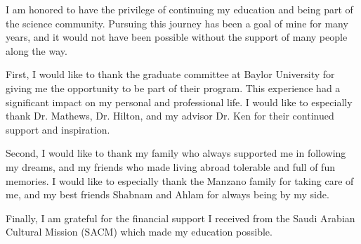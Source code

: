 
I am honored to have the privilege of continuing my education and being part of the science community. Pursuing this journey has been a goal of mine for many years, and it would not have been possible without the support of many people along the way.

First, I would like to thank the graduate committee at Baylor University for giving me the opportunity to be part of their program. This experience had a significant impact on my personal and professional life. I would like to especially thank Dr. Mathews, Dr. Hilton, and my advisor Dr. Ken for their continued support and inspiration.

Second, I would like to thank my family who always supported me in following my dreams, and my friends who made living abroad tolerable and full of fun memories. I would like to especially thank the Manzano family for taking care of me, and my best friends Shabnam and Ahlam for always being by my side.

Finally, I am grateful for the financial support I received from the Saudi Arabian Cultural Mission (SACM) which made my education possible.   

